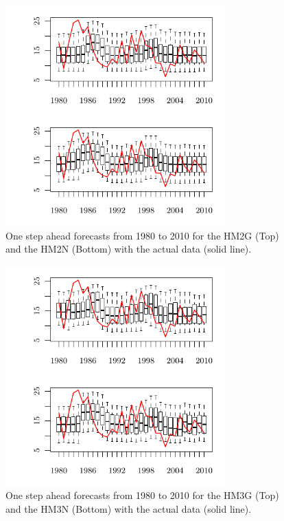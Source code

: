 \documentclass[wrr]{AGUTeX}
\begin{document}
\begin{figure}
\centering
\noindent\includegraphics[width=20pc]{plots/hmm-sim-figure8.pdf}
\caption{One step ahead forecasts from 1980 to 2010 for the HM2G (Top) and the HM2N (Bottom) with the actual data (solid line).}\label{fig:fc}
\end{figure}

\begin{figure}
\centering
\noindent\includegraphics[width=20pc]{plots/hmm-sim-figure9.pdf}
\caption{One step ahead forecasts from 1980 to 2010 for the HM3G (Top) and the HM3N (Bottom) with the actual data (solid line).}\label{fig:fc3}
\end{figure}
\end{document}
